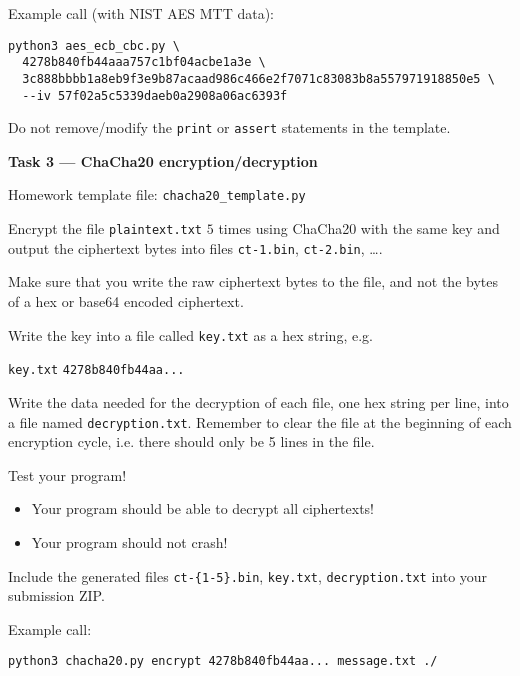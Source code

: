 \documentclass{practice}
\begin{document}
Example call (with NIST AES MTT data):%
\begin{verbatim}
python3 aes_ecb_cbc.py \ 
  4278b840fb44aaa757c1bf04acbe1a3e \
  3c888bbbb1a8eb9f3e9b87acaad986c466e2f7071c83083b8a557971918850e5 \
  --iv 57f02a5c5339daeb0a2908a06ac6393f
\end{verbatim}

Do not remove/modify the \texttt{print} or \texttt{assert} statements in the template.




\textbf{Task 3 --- ChaCha20 encryption/decryption}

Homework template file: \texttt{chacha20\_template.py}

Encrypt the file \texttt{plaintext.txt} $5$ times using ChaCha20 with the same key and output the ciphertext bytes into files \texttt{ct-1.bin}, \texttt{ct-2.bin}, \dots.

\begin{tcolorbox}[title=Note]
  Make sure that you write the raw ciphertext bytes to the file, and not the bytes of a hex or base64 encoded ciphertext.
\end{tcolorbox}

Write the key into a file called \texttt{key.txt} as a hex string, e.g.
\begin{tcolorbox}
  \texttt{key.txt}
  \tcblower
  \texttt{4278b840fb44aa...}
\end{tcolorbox}

Write the data needed for the decryption of each file, one hex string per line, into a file named \texttt{decryption.txt}.
Remember to clear the file at the beginning of each encryption cycle, i.e. there should only be 5 lines in the file.

Test your program!
\begin{itemize}
  \item Your program should be able to decrypt all ciphertexts!
  \item Your program should not crash!
\end{itemize}

Include the generated files \texttt{ct-\{1-5\}.bin}, \texttt{key.txt}, \texttt{decryption.txt} into your submission ZIP.

Example call:%
\begin{verbatim}
python3 chacha20.py encrypt 4278b840fb44aa... message.txt ./
\end{verbatim}
\end{document}
